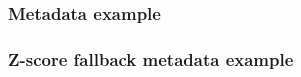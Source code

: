 \documentclass[11pt]{article}
\begin{document}
\subsubsection{Metadata example} \label{metadata_example}



\subsubsection{Z-score fallback metadata example}







\end{document}
